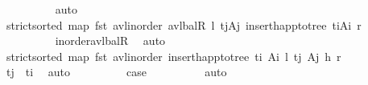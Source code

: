 \begin{isabellebody}
\ \ \ \ \ \ \ \ \isamarkupfalse%
\ auto\isanewline
\ \ \ \ \ \ \isamarkupfalse%
\ \isamarkupfalse%
\ {\isachardoublequoteopen}strict{\isacharunderscore}{\kern0pt}sorted\ {\isacharparenleft}{\kern0pt}map\ fst\ {\isacharparenleft}{\kern0pt}avl{\isacharunderscore}{\kern0pt}inorder\ {\isacharparenleft}{\kern0pt}avl{\isacharunderscore}{\kern0pt}balR\ l\ {\isacharparenleft}{\kern0pt}t\isactrlsub j{\isacharcomma}{\kern0pt}A\isactrlsub j{\isacharparenright}{\kern0pt}\ {\isacharparenleft}{\kern0pt}insert{\isacharunderscore}{\kern0pt}happ{\isacharunderscore}{\kern0pt}to{\isacharunderscore}{\kern0pt}tree\ {\isacharparenleft}{\kern0pt}t\isactrlsub i{\isacharcomma}{\kern0pt}A\isactrlsub i{\isacharparenright}{\kern0pt}\ r{\isacharparenright}{\kern0pt}{\isacharparenright}{\kern0pt}{\isacharparenright}{\kern0pt}{\isacharparenright}{\kern0pt}{\isachardoublequoteclose}\isanewline
\ \ \ \ \ \ \ \ \isamarkupfalse%
\ inorder{\isacharunderscore}{\kern0pt}avl{\isacharunderscore}{\kern0pt}balR\ \isamarkupfalse%
\ auto\isanewline
\ \ \ \ \ \ \isamarkupfalse%
\ \isamarkupfalse%
\ {\isachardoublequoteopen}strict{\isacharunderscore}{\kern0pt}sorted\ {\isacharparenleft}{\kern0pt}map\ fst\ {\isacharparenleft}{\kern0pt}avl{\isacharunderscore}{\kern0pt}inorder\ {\isacharparenleft}{\kern0pt}insert{\isacharunderscore}{\kern0pt}happ{\isacharunderscore}{\kern0pt}to{\isacharunderscore}{\kern0pt}tree\ {\isacharparenleft}{\kern0pt}t\isactrlsub i{\isacharcomma}{\kern0pt}\ A\isactrlsub i{\isacharparenright}{\kern0pt}\ {\isasymlangle}l{\isacharcomma}{\kern0pt}\ {\isacharparenleft}{\kern0pt}{\isacharparenleft}{\kern0pt}t\isactrlsub j{\isacharcomma}{\kern0pt}\ A\isactrlsub j{\isacharparenright}{\kern0pt}{\isacharcomma}{\kern0pt}\ h{\isacharparenright}{\kern0pt}{\isacharcomma}{\kern0pt}\ r{\isasymrangle}{\isacharparenright}{\kern0pt}{\isacharparenright}{\kern0pt}{\isacharparenright}{\kern0pt}{\isachardoublequoteclose}\isanewline
\ \ \ \ \ \ \ \ \isamarkupfalse%
\ {\isacartoucheopen}t\isactrlsub j\ {\isacharless}{\kern0pt}\ t\isactrlsub i{\isacartoucheclose}\ \isamarkupfalse%
\ auto\isanewline
\ \ \ \ \ \ \isamarkupfalse%
\ \isamarkupfalse%
\ {\isacharquery}{\kern0pt}case\isanewline
\ \ \ \ \ \ \ \ \isamarkupfalse%
\ auto\isanewline
\ \ \ \ \isamarkupfalse%
\isanewline
\ \ \isamarkupfalse%
%
\endisatagproof
{\isafoldproof}%
%
\isadelimproof

\end{isabellebody}
